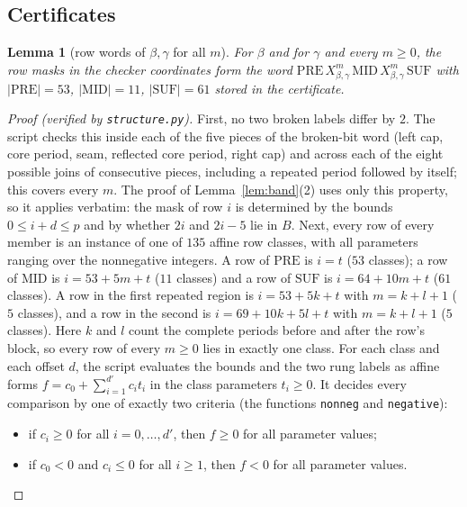 \documentclass[11pt]{amsart}
\newtheorem{lemma}[theorem]{Lemma}
\theoremstyle{definition}
\theoremstyle{remark}
\begin{document}
\subsection*{Certificates}
\begin{lemma}[row words of $\beta,\gamma$ for all $m$]\label{lem:bgword}
For $\beta$ and for $\gamma$ and every $m\ge0$, the row masks in the checker coordinates form the word $\mathrm{PRE}\,X_{\beta,\gamma}^m\,\mathrm{MID}\,X_{\beta,\gamma}^m\,\mathrm{SUF}$ with $|\mathrm{PRE}|=53$, $|\mathrm{MID}|=11$, $|\mathrm{SUF}|=61$ stored in the certificate.
\end{lemma}
\begin{proof}[Proof (verified by \texttt{structure.py})]
First, no two broken labels differ by $2$. The script checks this inside each of the five pieces of the broken-bit word (left cap, core period, seam, reflected core period, right cap) and across each of the eight possible joins of consecutive pieces, including a repeated period followed by itself; this covers every $m$. The proof of Lemma~\ref{lem:band}(2) uses only this property, so it applies verbatim: the mask of row $i$ is determined by the bounds $0\le i+d\le p$ and by whether $2i$ and $2i-5$ lie in $B$. Next, every row of every member is an instance of one of $135$ affine row classes, with all parameters ranging over the nonnegative integers. A row of $\mathrm{PRE}$ is $i=t$ ($53$ classes); a row of $\mathrm{MID}$ is $i=53+5m+t$ ($11$ classes) and a row of $\mathrm{SUF}$ is $i=64+10m+t$ ($61$ classes). A row in the first repeated region is $i=53+5k+t$ with $m=k+l+1$ ($5$ classes), and a row in the second is $i=69+10k+5l+t$ with $m=k+l+1$ ($5$ classes). Here $k$ and $l$ count the complete periods before and after the row's block, so every row of every $m\ge0$ lies in exactly one class. For each class and each offset $d$, the script evaluates the bounds and the two rung labels as affine forms $f=c_0+\sum_{i=1}^{d'}c_it_i$ in the class parameters $t_i\ge0$. It decides every comparison by one of exactly two criteria (the functions \texttt{nonneg} and \texttt{negative}):
\begin{itemize}
\item[(N)] if $c_i\ge0$ for all $i=0,\dots,d'$, then $f\ge0$ for all parameter values;
\item[(S)] if $c_0<0$ and $c_i\le0$ for all $i\ge1$, then $f<0$ for all parameter values.
\end{itemize}

\end{proof}
\end{document}
